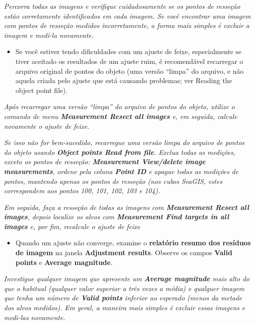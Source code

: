 \documentclass[
  12pt,
  letterpaper,
  DIV=11,
  numbers=noendperiod]{scrreprt}
\providecommand{\tightlist}{%
  \setlength{\itemsep}{0pt}\setlength{\parskip}{0pt}}
\begin{document}
\emph{Percorra todas as imagens e verifique cuidadosamente se os pontos
de resseção estão corretamente identificados em cada imagem. Se você
encontrar uma imagem com pontos de resseção medidos incorretamente, a
forma mais simples é excluir a imagem e medi-la novamente.}

\begin{itemize}
\tightlist
\item
  Se você estiver tendo dificuldades com um ajuste de feixe,
  especialmente se tiver aceitado os resultados de um ajuste ruim, é
  recomendável recarregar o arquivo original de pontos do objeto (uma
  versão ``limpa'' do arquivo, e não aquela criada pelo ajuste que está
  causando problemas; ver Reading the object point file).
\end{itemize}

\emph{Após recarregar uma versão ``limpa'' do arquivo de pontos do
objeto, utilize o comando de menu \textbf{Measurement \textbar{} Resect
all images} e, em seguida, calcule novamente o ajuste de feixe}.

\emph{Se isso não for bem-sucedido, recarregue uma versão limpa do
arquivo de pontos do objeto usando \textbf{Object points \textbar{} Read
from file}. Exclua todas as medições, exceto os pontos de resseção:
\textbf{Measurement \textbar{} View/delete image measurements}, ordene
pela coluna \textbf{Point ID} e apague todas as medições de pontos,
mantendo apenas os pontos de resseção (nos cubos SeaGIS, estes
correspondem aos pontos 100, 101, 102, 103 e 104).}

\emph{Em seguida, faça a resseção de todas as imagens com
\textbf{Measurement \textbar{} Resect all images}, depois localize os
alvos com \textbf{Measurement \textbar{} Find targets in all images} e,
por fim, recalcule o ajuste de feixe}

\begin{itemize}
\tightlist
\item
  Quando um ajuste não converge, examine o \textbf{relatório resumo dos
  resíduos de imagem} na janela \textbf{Adjustment results}. Observe os
  campos \textbf{Valid points} e \textbf{Average magnitude}.
\end{itemize}

\emph{Investigue qualquer imagem que apresente um \textbf{Average
magnitude} mais alto do que o habitual (qualquer valor superior a três
vezes a média) e qualquer imagem que tenha um número de \textbf{Valid
points} inferior ao esperado (menos da metade dos alvos medidos). Em
geral, a maneira mais simples é excluir essas imagens e medi-las
novamente.}
\end{document}
